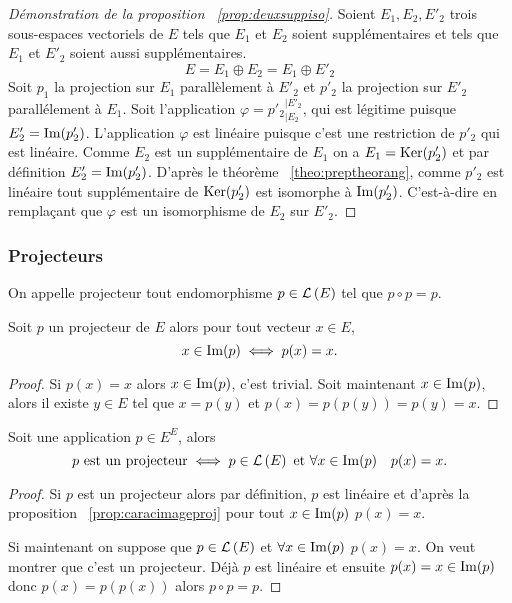 \begin{proof}[Démonstration de la proposition~
\ref{prop:deuxsuppiso}]
  Soient \(E_1, E_2, E'_2\) trois sous-espaces vectoriels de \(E\) tels que \(E_1\) et \(E_2\) soient supplémentaires et tels que \(E_1\) et \(E'_2\) soient aussi supplémentaires.
  \begin{equation}
    E=E_1 \oplus E_2 = E_1 \oplus E'_2
  \end{equation}
Soit \(p_1\) la projection sur \(E_1\) parallèlement à \(E'_2\) et \(p'_2\) la projection sur \(E'_2\) parallélement à \(E_1\). Soit l'application \(\varphi={p'_2}_{|E_2}^{|E'_2}\), qui est légitime puisque \(E'_2=\operatorname{Im}(p'_2)\). L'application \(\varphi\) est linéaire puisque c'est une restriction de \(p'_2\) qui est linéaire. Comme \(E_2\) est un supplémentaire de \(E_1\) on a \(E_1 = \operatorname{Ker}(p'_2)\) et par définition \(E'_2 = \operatorname{Im}(p'_2)\). D'après le théorème~
\ref{theo:preptheorang}, comme \(p'_2\) est linéaire tout supplémentaire de \(\operatorname{Ker}(p'_2)\) est isomorphe à \(\operatorname{Im}(p'_2)\). C'est-à-dire en remplaçant que \(\varphi\) est un isomorphisme de \(E_2\) sur \(E'_2\).
\end{proof}

\subsubsection{Projecteurs}

\begin{defdef}
  On appelle projecteur tout endomorphisme \(p \in \mathcal{L}\left(E\right)\) tel que \(p \circ p=p\).
\end{defdef}

\begin{prop}\label{prop:caracimageproj}
  Soit \(p\) un projecteur de \(E\) alors pour tout vecteur \(x \in E\),
  \begin{equation}
    x \in \operatorname{Im}(p) \iff p(x)=x.
  \end{equation}
\end{prop}
\begin{proof}
  Si \(p(x)=x\) alors \(x \in \operatorname{Im}(p)\), c'est trivial. Soit maintenant \(x \in \operatorname{Im}(p)\), alors il existe \(y \in E\) tel que \(x=p(y)\) et \(p(x)=p(p(y))=p(y)=x\).
\end{proof}

\begin{prop}
  Soit une application \(p \in E^E\), alors
  \begin{equation}
    p \text{~est un projecteur} \iff p \in \mathcal{L}\left(E\right) \text{~et~} \forall x \in \operatorname{Im}(p) \quad p(x)=x.
  \end{equation}
\end{prop}
\begin{proof}
  Si \(p\) est un projecteur alors par définition, \(p\) est linéaire et d'après la proposition~
\ref{prop:caracimageproj} pour tout \(x \in \operatorname{Im}(p)\) \(p(x)=x\).

  Si maintenant on suppose que \(p \in \mathcal{L}\left(E\right)\) et \(\forall x \in \operatorname{Im}(p)\) \(p(x)=x\). On veut montrer que c'est un projecteur. Déjà \(p\) est linéaire et ensuite \(p(x)=x \in \operatorname{Im}(p)\) donc \(p(x)=p(p(x))\) alors \(p \circ p=p\).
\end{proof}

